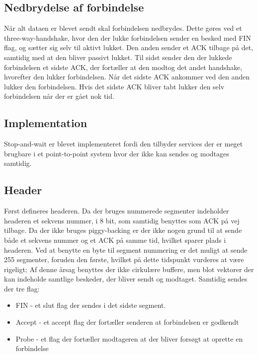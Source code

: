 \subsection {Nedbrydelse af forbindelse}

Når alt dataen er blevet sendt skal forbindelsen nedbrydes. Dette gøres ved et three-way-handshake, hvor den der lukke forbindelsen sender en besked med FIN flag, og sætter sig selv til aktivt lukket. Den anden sender et ACK tilbage på det, samtidig med at den bliver passivt lukket. Til sidst sender den der lukkede forbindelsen et sidste ACK, der fortæller at den modtog det andet handshake, hvorefter den lukker forbindelsen. Når det sidste ACK ankommer ved den anden lukker den forbindelsen. Hvis det sidste ACK bliver tabt lukker den selv forbindelsen når der er gået nok tid.

\subsection{Implementation}

Stop-and-wait er blevet implementeret fordi den tilbyder services der er meget brugbare i et point-to-point system hvor der ikke kan sendes og modtages samtidig.
\subsection{Header}

Først defineres headeren. Da der bruges nummerede segmenter indeholder headeren et sekvens nummer, i 8 bit, som samtidig benyttes som ACK på vej tilbage. Da der ikke bruges piggy-backing er der ikke nogen grund til at sende både et sekvens nummer og et ACK på samme tid, hvilket sparer plads i headeren. Ved at benytte en byte til segment nummering er det muligt at sende 255 segmenter, foruden den første, hvilket på dette tidspunkt vurderes at være rigeligt; Af denne årsag benyttes der ikke cirkulære buffere, men blot vektorer der kan indeholde samtlige beskeder, der bliver sendt og modtaget. Samtidig sendes der tre flag:

\begin{itemize}
\item FIN - et slut flag der sendes i det sidste segment.
\item Accept - et accept flag der fortæller senderen at forbindelsen er godkendt
\item Probe - et flag der fortæller modtageren at der bliver forsøgt at oprette en forbindelse
\end{itemize}

